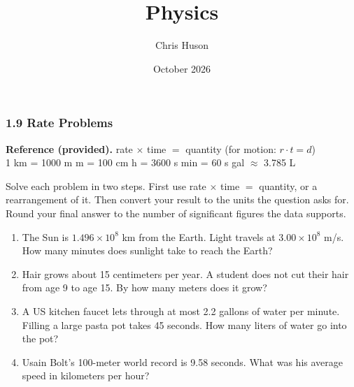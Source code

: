 \documentclass[12pt, twoside]{article}
\title{Physics}
\author{Chris Huson}
\date{October 2026}
\begin{document}
\subsubsection*{1.9 Rate Problems}

\textbf{Reference (provided).} \quad
rate $\times$ time $=$ quantity \quad (for motion: $r \cdot t = d$) \\[0.1cm]
1 km = 1000 m  m = 100 cm  h = 3600 s  min = 60 s
 gal $\approx$ 3.785 L

\vspace{0.2cm}

Solve each problem in two steps. First use rate $\times$ time $=$ quantity, or a
rearrangement of it. Then convert your result to the units the question asks for.
Round your final answer to the number of significant figures the data supports.

\vspace{0.3cm}

\begin{enumerate}

\item The Sun is $1.496 \times 10^{8}$ km from the Earth. Light travels at
  $3.00 \times 10^{8}$ m/s. How many minutes does sunlight take to reach the Earth?
  \vspace{7.5cm}

\item Hair grows about 15 centimeters per year. A student does not cut their hair from
  age 9 to age 15. By how many meters does it grow?

\newpage

\item A US kitchen faucet lets through at most 2.2 gallons of water per minute. Filling
  a large pasta pot takes 45 seconds. How many liters of water go into the pot?
  \vspace{9cm}

\item Usain Bolt's 100-meter world record is 9.58 seconds. What was his average speed in
  kilometers per hour?

\end{enumerate}
\end{document}
